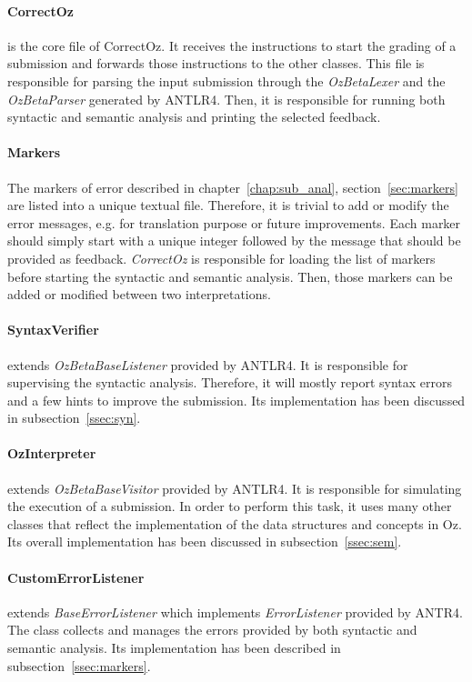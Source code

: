 \documentclass[11pt,a4paper,twoside,openright]{report}
\begin{document}
\paragraph{CorrectOz}
is the core file of CorrectOz. It receives the instructions to start the grading 
of a submission and forwards those instructions to the other classes. This file 
is responsible for parsing the input submission through the \textit{OzBetaLexer} 
and the \textit{OzBetaParser} generated by \textsc{ANTLR4}. Then, it is 
responsible for running both syntactic and semantic analysis and printing the 
selected feedback.

\paragraph{Markers}
The markers of error described in chapter~\ref{chap:sub_anal}, 
section~\ref{sec:markers} are listed into 
a unique textual file. Therefore, it is trivial to add or modify the error 
messages, e.g. for translation purpose or future improvements. Each marker 
should simply start with a unique integer followed by the message that should 
be provided as feedback. \textit{CorrectOz} is responsible for loading the 
list of markers before starting the syntactic and semantic analysis. Then, those 
markers can be added or modified between two interpretations.

\paragraph{SyntaxVerifier}
extends \textit{OzBetaBaseListener} provided by \textsc{ANTLR4}. It is 
responsible for supervising the syntactic analysis. Therefore, it will mostly 
report syntax errors and a few hints to improve the submission. Its 
implementation has been discussed in subsection~\ref{ssec:syn}.

\paragraph{OzInterpreter}
extends \textit{OzBetaBaseVisitor} provided by \textsc{ANTLR4}. It is 
responsible for simulating the execution of a submission. In order to perform 
this task, it uses many other classes that reflect the implementation of the 
data structures and concepts in Oz. Its overall implementation has been 
discussed in subsection~\ref{ssec:sem}.

\paragraph{CustomErrorListener}
extends \textit{BaseErrorListener} which implements \textit{ErrorListener} 
provided by \textsc{ANTR4}. The class collects and manages the errors provided 
by both syntactic and semantic analysis. Its implementation has been described 
in subsection~\ref{ssec:markers}.
\end{document}
